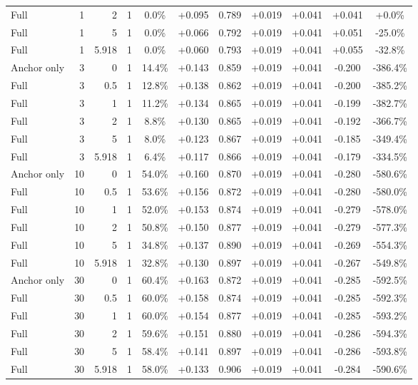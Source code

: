 \begin{table}[htbp]
\begin{tabular}{lrrrccccccc}
Full & 1 & 2 & 1 & 0.0\% & +0.095 & 0.789 & +0.019 & +0.041 & +0.041 & +0.0\% \\
Full & 1 & 5 & 1 & 0.0\% & +0.066 & 0.792 & +0.019 & +0.041 & +0.051 & -25.0\% \\
Full & 1 & 5.918 & 1 & 0.0\% & +0.060 & 0.793 & +0.019 & +0.041 & +0.055 & -32.8\% \\
Anchor only & 3 & 0 & 1 & 14.4\% & +0.143 & 0.859 & +0.019 & +0.041 & -0.200 & -386.4\% \\
Full & 3 & 0.5 & 1 & 12.8\% & +0.138 & 0.862 & +0.019 & +0.041 & -0.200 & -385.2\% \\
Full & 3 & 1 & 1 & 11.2\% & +0.134 & 0.865 & +0.019 & +0.041 & -0.199 & -382.7\% \\
Full & 3 & 2 & 1 & 8.8\% & +0.130 & 0.865 & +0.019 & +0.041 & -0.192 & -366.7\% \\
Full & 3 & 5 & 1 & 8.0\% & +0.123 & 0.867 & +0.019 & +0.041 & -0.185 & -349.4\% \\
Full & 3 & 5.918 & 1 & 6.4\% & +0.117 & 0.866 & +0.019 & +0.041 & -0.179 & -334.5\% \\
Anchor only & 10 & 0 & 1 & 54.0\% & +0.160 & 0.870 & +0.019 & +0.041 & -0.280 & -580.6\% \\
Full & 10 & 0.5 & 1 & 53.6\% & +0.156 & 0.872 & +0.019 & +0.041 & -0.280 & -580.0\% \\
Full & 10 & 1 & 1 & 52.0\% & +0.153 & 0.874 & +0.019 & +0.041 & -0.279 & -578.0\% \\
Full & 10 & 2 & 1 & 50.8\% & +0.150 & 0.877 & +0.019 & +0.041 & -0.279 & -577.3\% \\
Full & 10 & 5 & 1 & 34.8\% & +0.137 & 0.890 & +0.019 & +0.041 & -0.269 & -554.3\% \\
Full & 10 & 5.918 & 1 & 32.8\% & +0.130 & 0.897 & +0.019 & +0.041 & -0.267 & -549.8\% \\
Anchor only & 30 & 0 & 1 & 60.4\% & +0.163 & 0.872 & +0.019 & +0.041 & -0.285 & -592.5\% \\
Full & 30 & 0.5 & 1 & 60.0\% & +0.158 & 0.874 & +0.019 & +0.041 & -0.285 & -592.3\% \\
Full & 30 & 1 & 1 & 60.0\% & +0.154 & 0.877 & +0.019 & +0.041 & -0.285 & -593.2\% \\
Full & 30 & 2 & 1 & 59.6\% & +0.151 & 0.880 & +0.019 & +0.041 & -0.286 & -594.3\% \\
Full & 30 & 5 & 1 & 58.4\% & +0.141 & 0.897 & +0.019 & +0.041 & -0.286 & -593.8\% \\
Full & 30 & 5.918 & 1 & 58.0\% & +0.133 & 0.906 & +0.019 & +0.041 & -0.284 & -590.6\% \\

\end{tabular}
\end{table}
